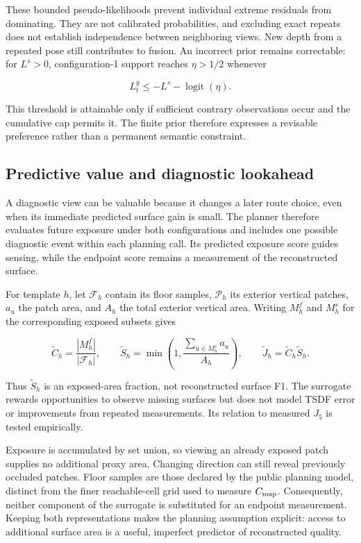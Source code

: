 \documentclass[11pt,a4paper]{article}
\providecommand{\hypertarget}[2]{#2}
\begin{document}
These bounded pseudo-likelihoods prevent individual extreme residuals from dominating. They are not calibrated probabilities, and excluding exact repeats does not establish independence between neighboring views. New depth from a repeated pose still contributes to fusion. An incorrect prior remains correctable: for \(L^s>0\), configuration-1 support reaches \(\eta>1/2\) whenever

\[
L_t^g\le-L^s-\operatorname{logit}(\eta).
\]

This threshold is attainable only if sufficient contrary observations occur and the cumulative cap permits it. The finite prior therefore expresses a revisable preference rather than a permanent semantic constraint.

\hypertarget{predictive-value-and-diagnostic-lookahead}{%
\subsection{Predictive value and diagnostic lookahead}\label{predictive-value-and-diagnostic-lookahead}}

A diagnostic view can be valuable because it changes a later route choice, even when its immediate predicted surface gain is small. The planner therefore evaluates future exposure under both configurations and includes one possible diagnostic event within each planning call. Its predicted exposure score guides sensing, while the endpoint score remains a measurement of the reconstructed surface.

For template \(h\), let \(\mathcal F_h\) contain its floor samples, \(\mathcal P_h\) its exterior vertical patches, \(a_u\) the patch area, and \(A_h\) the total exterior vertical area. Writing \(M_h^f\) and \(M_h^s\) for the corresponding exposed subsets gives

\[
\widetilde C_h=\frac{|M_h^f|}{|\mathcal F_h|},\qquad
\widetilde S_h=\min\left(1,\frac{\sum_{u\in M_h^s}a_u}{A_h}\right),\qquad
\widetilde J_h=\widetilde C_h\widetilde S_h.
\]

Thus \(\widetilde S_h\) is an exposed-area fraction, not reconstructed surface F1. The surrogate rewards opportunities to observe missing surfaces but does not model TSDF error or improvements from repeated measurements. Its relation to measured \(J_5\) is tested empirically.

Exposure is accumulated by set union, so viewing an already exposed patch supplies no additional proxy area. Changing direction can still reveal previously occluded patches. Floor samples are those declared by the public planning model, distinct from the finer reachable-cell grid used to measure \(C_{\rm map}\). Consequently, neither component of the surrogate is substituted for an endpoint measurement. Keeping both representations makes the planning assumption explicit: access to additional surface area is a useful, imperfect predictor of reconstructed quality.
\end{document}
